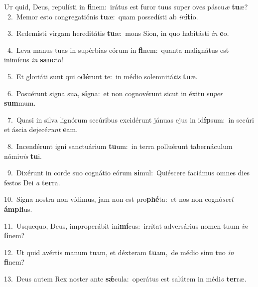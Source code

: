 \lettrine{\initial\textcolor{\initialcolor}{U}}{t} quid, Deus, repulísti in \textbf{fi}\-nem:~\star irátus est furor tuus super oves páscu\textit{æ} \textbf{tu}\-æ?\\
{\numbfont\textcolor{\numbcolor}{~2.}}~Memor esto congregatiónis \textbf{tu}\-æ:~\star quam possedísti ab \textit{in}\-\textbf{í}\textbf{ti}o.\par
{\numbfont\textcolor{\numbcolor}{~3.}}~Redemísti virgam hereditátis \textbf{tu}\-æ:~\star mons Sion, in quo habitásti \textit{in} \textbf{e}\-o.\par
{\numbfont\textcolor{\numbcolor}{~4.}}~Leva manus tuas in supérbias eórum in \textbf{fi}\-nem:~\star quanta malignátus est inimícus \textit{in} \textbf{sanc}\-to!\par
{\numbfont\textcolor{\numbcolor}{~5.}}~Et gloriáti sunt qui o\-\textbf{dé}\-runt te:~\star in médio solemnitá\textit{tis} \textbf{tu}\-æ.\par
{\numbfont\textcolor{\numbcolor}{~6.}}~Posuérunt signa sua, \textbf{si}\-gna:~\star et non cognovérunt sicut in éxitu su\textit{per} \textbf{sum}\-mum.\par
{\numbfont\textcolor{\numbcolor}{~7.}}~Quasi in silva lignórum secúribus excidérunt jánuas ejus in id\-\textbf{íp}\-sum:~\star in secúri et áscia dejecé\textit{runt} \textbf{e}\-am.\par
{\numbfont\textcolor{\numbcolor}{~8.}}~Incendérunt igni sanctuárium \textbf{tu}\-um:~\star in terra polluérunt tabernáculum nómi\textit{nis} \textbf{tu}\-i.\par
{\numbfont\textcolor{\numbcolor}{~9.}}~Dixérunt in corde suo cognátio eórum \textbf{si}\-mul:~\star Quiéscere faciámus omnes dies festos Dei \textit{a} \textbf{ter}\-ra.\par
{\numbfont\textcolor{\numbcolor}{10.}}~Signa nostra non vídimus, jam non est pro\-\textbf{phé}\-ta:~\star et nos non cognó\textit{scet} \textbf{ám}\-\textbf{pli}us.\par
{\numbfont\textcolor{\numbcolor}{11.}}~Usquequo, Deus, improperábit ini\-\textbf{mí}\-cus:~\star irrítat adversárius nomen tuum \textit{in} \textbf{fi}\-nem?\par
{\numbfont\textcolor{\numbcolor}{12.}}~Ut quid avértis manum tuam, et déxteram \textbf{tu}\-am,~\star de médio sinu tuo \textit{in} \textbf{fi}\-nem?\par
{\numbfont\textcolor{\numbcolor}{13.}}~Deus autem Rex noster ante \textbf{sǽ}\-cula:~\star operátus est salútem in médi\textit{o} \textbf{ter}\-ræ.\par
